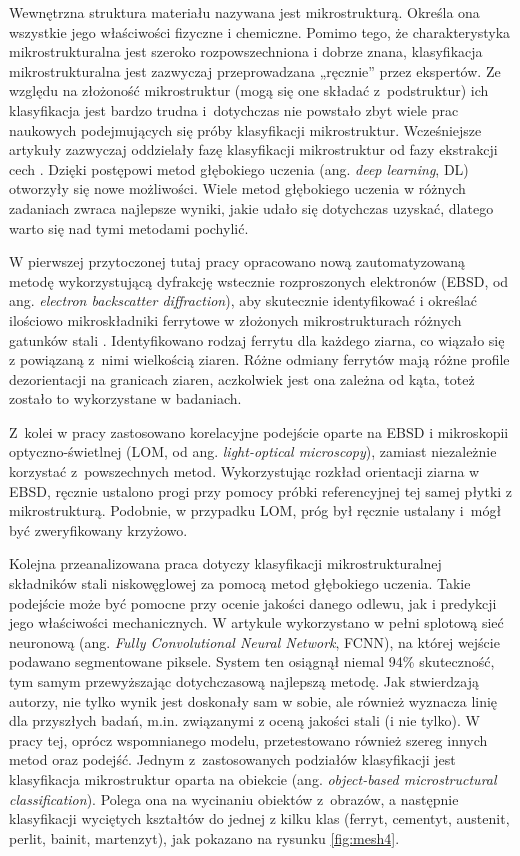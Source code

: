 Wewnętrzna struktura materiału nazywana jest mikrostrukturą. Określa ona wszystkie jego właściwości fizyczne i chemiczne. Pomimo tego, że charakterystyka mikrostrukturalna jest szeroko rozpowszechniona i dobrze znana, klasyfikacja mikrostrukturalna jest zazwyczaj przeprowadzana „ręcznie” przez ekspertów. Ze względu na złożoność mikrostruktur (mogą się one składać z~podstruktur) ich klasyfikacja jest bardzo trudna i~dotychczas nie powstało zbyt wiele prac naukowych podejmujących się próby klasyfikacji mikrostruktur. Wcześniejsze artykuły zazwyczaj oddzielały fazę klasyfikacji mikrostruktur od fazy ekstrakcji cech \cite{Azimi18}. Dzięki postępowi metod głębokiego uczenia (ang. \textit{deep learning}, DL) otworzyły się nowe możliwości. Wiele metod głębokiego uczenia w różnych zadaniach zwraca najlepsze wyniki, jakie udało się dotychczas uzyskać, dlatego warto się nad tymi metodami pochylić. 

W pierwszej przytoczonej tutaj pracy opracowano nową zautomatyzowaną metodę wykorzystującą dyfrakcję wstecznie rozproszonych elektronów (EBSD, od ang. \textit{electron backscatter diffraction}), aby skutecznie identyfikować i określać ilościowo mikroskładniki ferrytowe w złożonych mikrostrukturach różnych gatunków stali \cite{Shrestha13}. Identyfikowano rodzaj ferrytu dla każdego ziarna, co wiązało się z powiązaną z~nimi wielkością ziaren. Różne odmiany ferrytów mają różne profile dezorientacji na granicach ziaren, aczkolwiek jest ona zależna od kąta, toteż zostało to wykorzystane w badaniach.

Z~kolei w pracy \cite{Britz17} zastosowano korelacyjne podejście oparte na EBSD i mikroskopii optyczno-świetlnej (LOM, od ang. \textit{light-optical microscopy}), zamiast niezależnie korzystać z~powszechnych metod. Wykorzystując rozkład orientacji ziarna w EBSD, ręcznie ustalono progi przy pomocy próbki referencyjnej tej samej płytki z mikrostrukturą. Podobnie, w przypadku LOM, próg był ręcznie ustalany i~mógł być zweryfikowany krzyżowo.

Kolejna przeanalizowana praca \cite{Azimi18} dotyczy klasyfikacji mikrostrukturalnej składników stali niskowęglowej za pomocą metod głębokiego uczenia. Takie podejście może być pomocne przy ocenie jakości danego odlewu, jak i predykcji jego właściwości mechanicznych. W artykule wykorzystano w pełni splotową sieć neuronową (ang. \textit{Fully Convolutional Neural Network}, FCNN), na której wejście podawano segmentowane piksele. System ten osiągnął niemal 94\% skuteczność, tym samym przewyższając dotychczasową najlepszą metodę. Jak stwierdzają autorzy, nie tylko wynik jest doskonały sam w sobie, ale również wyznacza linię dla przyszłych badań, m.in. związanymi z oceną jakości stali (i nie tylko). W pracy tej, oprócz wspomnianego modelu, przetestowano również szereg innych metod oraz podejść. Jednym z~zastosowanych podziałów klasyfikacji jest klasyfikacja mikrostruktur oparta na obiekcie (ang. \textit{object-based microstructural classification}). Polega ona na wycinaniu obiektów z~obrazów, a następnie klasyfikacji wyciętych kształtów do jednej z kilku klas (ferryt, cementyt, austenit, perlit, bainit, martenzyt), jak pokazano na rysunku \ref{fig:mesh4}.  


